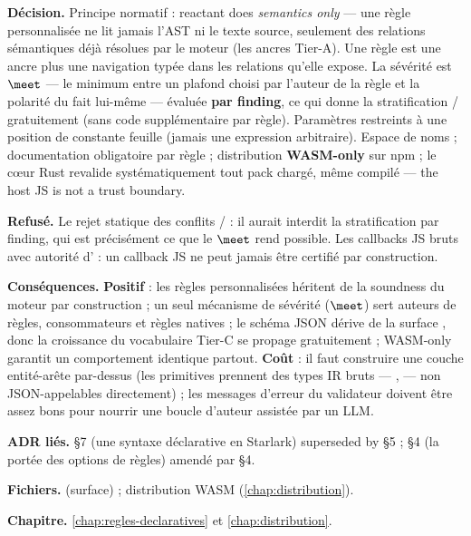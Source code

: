 \textbf{Décision.} Principe normatif : \og reactant does \emph{semantics
only}\fg{} --- une règle personnalisée ne lit jamais l'AST ni le texte source,
seulement des relations sémantiques déjà résolues par le moteur (les
\og ancres\fg{} Tier-A). Une règle est une ancre plus une navigation typée
dans les relations qu'elle expose. La sévérité est  $\meet$ 
--- le minimum entre un plafond choisi par l'auteur de la règle et la
polarité du fait lui-même --- évaluée \textbf{par finding}, ce qui donne la
stratification \Error{}/\Warning{} \og gratuitement\fg{} (sans code
supplémentaire par règle). Paramètres restreints à une position de constante
feuille (jamais une expression arbitraire). Espace de noms  ;
documentation obligatoire par règle ; distribution \textbf{WASM-only} sur
npm ; le cœur Rust revalide systématiquement tout pack chargé, même compilé
--- \og the host JS is not a trust boundary\fg{}.

\textbf{Refusé.} Le rejet statique des conflits / :
il aurait interdit la stratification par finding, qui est précisément ce que
le $\meet$ rend possible. Les callbacks JS bruts avec autorité
d'\Error{} : un callback JS ne peut jamais être certifié par construction.

\textbf{Conséquences.} \textbf{Positif} : les règles personnalisées héritent
de la soundness du moteur par construction ; un seul mécanisme de sévérité
($\meet$) sert auteurs de règles, consommateurs et règles natives ; le
schéma JSON dérive de la surface , donc la croissance du
vocabulaire Tier-C se propage gratuitement ; WASM-only garantit un
comportement identique partout. \textbf{Coût} : il faut construire une couche
\og entité-arête\fg{} par-dessus  (les primitives prennent des
types IR bruts --- ,  --- non JSON-appelables
directement) ; les messages d'erreur du validateur doivent être assez bons
pour nourrir une boucle d'auteur assistée par un LLM.

\textbf{ADR liés.} §7 (une syntaxe déclarative en Starlark) superseded by
 §5 ; §4 (la portée des options de règles) amendé par  §4.

\textbf{Fichiers.}  (surface) ; distribution WASM (\cref{chap:distribution}).

\textbf{Chapitre.} \cref{chap:regles-declaratives} et \cref{chap:distribution}.

